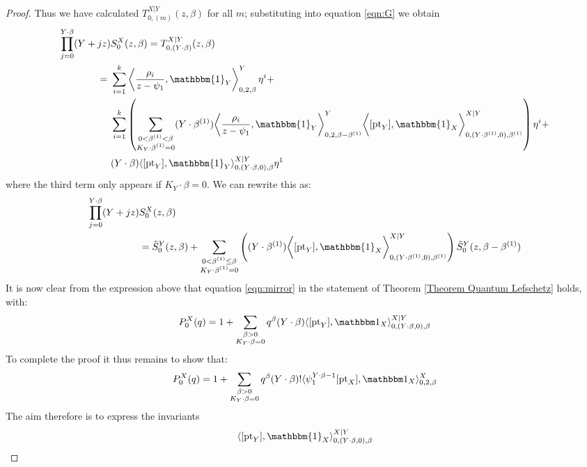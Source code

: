 \begin{proof}
Thus we have calculated $T_{0,(m)}^{X|Y}(z,\beta)$ for all $m$; substituting into equation \eqref{eqn:G} we obtain
\begin{align*} \prod_{j=0}^{Y \cdot \beta} (Y + jz) & S_0^X(z,\beta) = T_{0,(Y\cdot\beta)}^{X|Y}(z,\beta) \\
= \ & \sum_{i=1}^k \left\langle \dfrac{\rho_i}{z-\psi_1}, \mathbbm{1}_Y \right\rangle_{0,2,\beta}^Y \eta^i + \\
& \sum_{i=1}^k \left( \sum_{\substack{0 < \beta^{(1)} < \beta \\ K_Y \cdot \beta^{(1)}=0}} (Y \cdot \beta^{(1)}) \bigg\langle \dfrac{\rho_i}{z-\psi_1}, \mathbbm{1}_Y \bigg\rangle_{0,2,\beta-\beta^{(1)}}^Y \bigg\langle [\pt_Y], \mathbbm{1}_X \bigg\rangle_{0,(Y \cdot \beta^{(1)},0),\beta^{(1)}}^{X|Y} \right) \eta^i + \\
& (Y \cdot \beta) \langle [\pt_Y] , \mathbbm{1}_Y \rangle_{0,(Y \cdot \beta,0),\beta}^{X|Y} \eta^1
\end{align*}
where the third term only appears if $K_Y \cdot \beta=0$. We can rewrite this as:
\begin{align*} \prod_{j=0}^{Y \cdot \beta} (Y + jz) & S_0^X(z,\beta) \\
& = \tilde{S}_0^Y(z,\beta) + \sum_{\substack{0 < \beta^{(1)} \leq \beta \\ K_Y \cdot \beta^{(1)}=0}} \left( (Y \cdot \beta^{(1)}) \bigg\langle [\pt_Y], \mathbbm{1}_X \bigg\rangle_{0,(Y \cdot \beta^{(1)},0),\beta^{(1)}}^{X|Y} \right) \tilde{S}_0^Y(z,\beta-\beta^{(1)})
\end{align*}
It is now clear from the expression above that equation \eqref{eqn:mirror} in the statement of Theorem \ref{Theorem Quantum Lefschetz} holds, with:
\begin{equation*} P_0^X(q) = 1 + \sum_{\substack{\beta>0 \\ K_Y\cdot\beta=0}} q^\beta (Y\cdot\beta) \langle [\pt_Y],\mathbbm 1_{X}\rangle_{0,(Y\cdot\beta,0),\beta}^{X|Y} \end{equation*}
To complete the proof it thus remains to show that:
\begin{equation*} P_0^X(q) = 1 + \sum_{\substack{\beta>0 \\ K_Y\cdot\beta=0}} q^\beta(Y\cdot\beta)!\langle\psi_1^{Y\cdot\beta-1} [\pt_X],\mathbbm 1_{X}\rangle_{0,2,\beta}^X \end{equation*}
The aim therefore is to express the invariants
\begin{equation*} \langle [\pt_Y] , \mathbbm{1}_X \rangle_{0,(Y\cdot\beta,0),\beta}^{X|Y} \end{equation*}

\end{proof}
